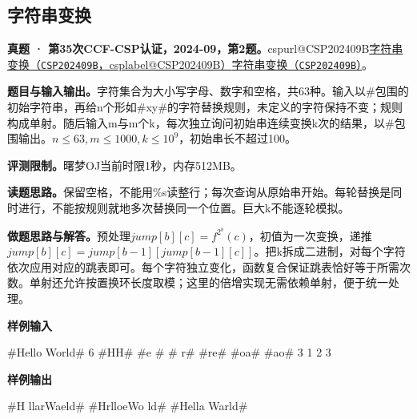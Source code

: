\documentclass[UTF8,11pt,a4paper,fontset=none]{ctexart}
\makeatletter
\newcommand{\csp}[2]{\ifcsname cspurl@#1\endcsname\href{\csname cspurl@#1\endcsname}{#2（\texttt{#1}，\csname csplabel@#1\endcsname）}\else\href{https://oj.shumeng.tech/p/#1}{#2（\texttt{#1}）}\fi}
\makeatother
\begin{document}
\subsection{字符串变换}
\textbf{真题 · 第35次CCF-CSP认证，2024-09，第2题。}\csp{CSP202409B}{字符串变换}。

\noindent\textbf{题目与输入输出。}字符集合为大小写字母、数字和空格，共63种。输入以\#包围的初始字符串，再给n个形如\#xy\#的字符替换规则，未定义的字符保持不变；规则构成单射。随后输入m与m个k，每次独立询问初始串连续变换k次的结果，以\#包围输出。$n\le63,m\le1000,k\le10^9$，初始串长不超过100。

\noindent\textbf{评测限制。}曙梦OJ当前时限1秒，内存512MB。

\noindent\textbf{读题思路。}保留空格，不能用\%s读整行；每次查询从原始串开始。每轮替换是同时进行，不能按规则就地多次替换同一个位置。巨大k不能逐轮模拟。

\noindent\textbf{做题思路与解答。}预处理$jump[b][c]=f^{2^b}(c)$，初值为一次变换，递推$jump[b][c]=jump[b-1][jump[b-1][c]]$。把k拆成二进制，对每个字符依次应用对应的跳表即可。每个字符独立变化，函数复合保证跳表恰好等于所需次数。单射还允许按置换环长度取模；这里的倍增实现无需依赖单射，便于统一处理。
\begin{tcolorbox}[samplebox,title={输入输出样例}]
\textbf{样例输入}
\begin{Sample}
#Hello World#
6
#HH#
#e #
# r#
#re#
#oa#
#ao#
3
1 2 3
\end{Sample}
\tcblower
\textbf{样例输出}
\begin{Sample}
#H llarWaeld#
#HrlloeWo ld#
#Hella Warld#
\end{Sample}
\end{tcolorbox}
\end{document}
